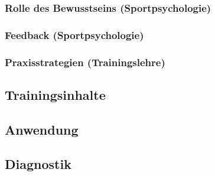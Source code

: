 \subsubsection*{Rolle des Bewusstseins (Sportpsychologie)}



\subsubsection*{Feedback (Sportpsychologie)}

\subsubsection*{Praxisstrategien (Trainingslehre)}

\subsection{Trainingsinhalte}

\subsection{Anwendung}

\subsection{Diagnostik}


